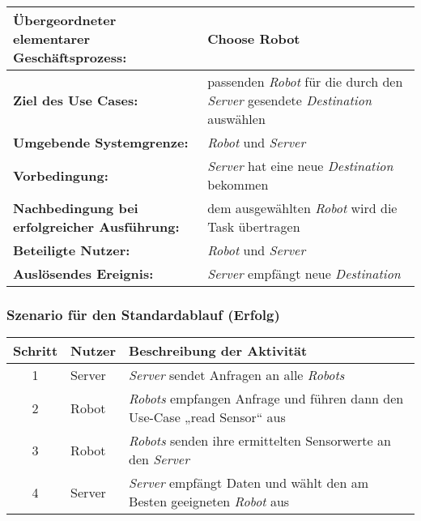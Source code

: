 			\begin{table}[H]
				\centering
				\begin{tabularx}{\textwidth}{@{}p{5cm}X@{}}
				\toprule
				\textbf{Übergeordneter elementarer Geschäftsprozess:} & Choose Robot \\ \midrule
				\textbf{Ziel des Use Cases:} & passenden \emph{Robot} für die durch den \emph{Server} gesendete \emph{Destination} auswählen\\ \midrule
				\textbf{Umgebende Systemgrenze:} & \emph{Robot} und \emph{Server} \\ \midrule
				\textbf{Vorbedingung:} & \emph{Server} hat eine neue \emph{Destination} bekommen\\ \midrule
				\textbf{Nachbedingung bei erfolgreicher Ausführung:} & dem ausgewählten \emph{Robot} wird die Task übertragen\\ \midrule
				\textbf{Beteiligte Nutzer:} & \emph{Robot} und \emph{Server}\\ \midrule
				\textbf{Auslösendes Ereignis:} & \emph{Server} empfängt neue \emph{Destination}\\
				\bottomrule
				\end{tabularx}
			\end{table}

			\subsubsection*{Szenario für den Standardablauf (Erfolg)}

			\begin{table}[H]
				\centering
				\begin{tabularx}{\textwidth}{@{}cp{2cm}X@{}}
				\toprule
				Schritt & Nutzer & Beschreibung der Aktivität \\ \midrule
				1 & Server & \emph{Server} sendet Anfragen an alle \emph{Robots} \\
				2 & Robot & \emph{Robots} empfangen Anfrage und führen dann den Use-Case „read Sensor“ aus \\
				3 & Robot & \emph{Robots} senden ihre ermittelten Sensorwerte an den \emph{Server}\\
				4 & Server & \emph{Server} empfängt Daten und wählt den am Besten geeigneten \emph{Robot} aus \\
				\bottomrule
				\end{tabularx}
			\end{table}

			
